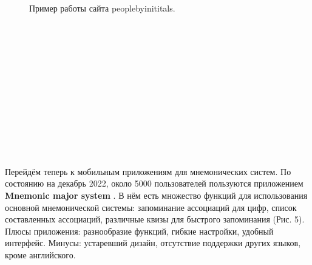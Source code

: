 \documentclass[draft]{article}
\begin{document}
\begin{figure}[h]
\caption{Пример работы сайта peoplebyinititals.}
\label{ris:image}
\end{figure}\\
~\\
~\\
~\\
~\\
~\\
~\\
~\\
~\\
~\\
~\\
~\\
Перейдём теперь к мобильным приложениям для мнемонических систем. По состоянию на декабрь 2022, около 5000 пользователей пользуются приложением \textbf{Mnemonic major system} \cite{litlink9}. В нём есть множество функций для использования основной мнемонической системы: запоминание ассоциаций для цифр, список составленных ассоциаций, различные квизы для быстрого запоминания (Рис. 5). Плюсы приложения: разнообразие функций, гибкие настройки, удобный интерфейс. Минусы: устаревший дизайн, отсутствие поддержки других языков, кроме английского.\\
\end{document}
